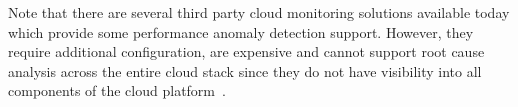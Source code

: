 

Note that there are several
third party cloud monitoring solutions available today which provide some performance
anomaly detection support. However, they require additional configuration, are expensive
and cannot support root cause analysis across the entire cloud stack since they do not
have visibility into all components of the cloud
platform~\cite{XXX}.
